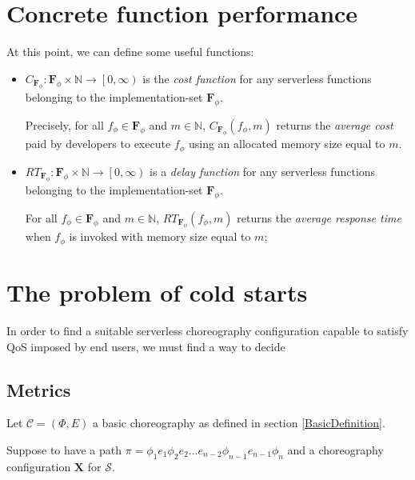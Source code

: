 \documentclass[10pt,a4paper]{report}
\newcommand*{\N}{\mathbb{N}}
\theoremstyle{definition}
\begin{document}
\section{Concrete function performance}

At this point, we can define some useful functions:

\begin{itemize}	
	\item $C_{\textbf{F}_{\phi}} : \textbf{F}_{\phi} \times \N \to \left[ 0, \infty \right)$ is the \textit{cost function} for any serverless functions belonging to the implementation-set $\textbf{F}_{\phi}$.
	
	Precisely, for all $f_{\phi} \in \textbf{F}_{\phi}$ and $m \in \N$, $C_{\textbf{F}_{\phi}}(f_{\phi}, m)$ returns the \textit{average cost} paid by developers to execute $f_{\phi}$ using an allocated memory size equal to $m$.
	
	
	\item $RT_{\textbf{F}_{\phi}} : \textbf{F}_{\phi} \times \N \to \left[ 0, \infty \right)$ is a \textit{delay function} for any serverless functions belonging to the implementation-set $\textbf{F}_{\phi}$.
	
	For all $f_{\phi} \in \textbf{F}_{\phi}$ and $m \in \N$, $RT_{\textbf{F}_{\phi}}(f_{\phi}, m)$ returns the \textit{average response time} when $f_{\phi}$ is invoked with memory size equal to $m$;
\end{itemize}






\section{The problem of cold starts}

In order to find a suitable serverless choreography configuration capable to satisfy QoS imposed by end users, we must find a way to decide  





\subsection{Metrics}

Let $\mathcal{C} = (\Phi,E)$ a basic choreography as defined in section \ref{BasicDefinition}.



Suppose to have a path $\pi = \phi_1 e_1 \phi_2 e_2 \ldots e_{n-2}\phi_{n-1} e_{n-1} \phi_n$ and a choreography configuration $\textbf{X}$ for $\mathcal{S}$. 
\end{document}
